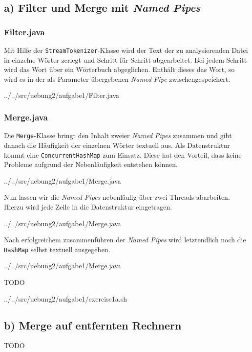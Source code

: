 \subsection*{a) Filter und Merge mit \emph{Named Pipes}}
\subsubsection*{Filter.java}
	Mit Hilfe der \texttt{StreamTokenizer}-Klasse wird der Text der zu analysierenden Datei in einzelne Wörter zerlegt und Schritt für Schritt abgearbeitet.
	Bei jedem Schritt wird das Wort über ein Wörterbuch abgeglichen. Enthält dieses das Wort, so wird es in der als Parameter übergebenen \emph{Named Pipe} zwischengespeichert.
	
	{../../src/uebung2/aufgabe1/Filter.java}

\subsubsection*{Merge.java}
	Die \texttt{Merge}-Klasse bringt den Inhalt zweier \emph{Named Pipes} zusammen und gibt danach die Häufigkeit der einzelnen Wörter textuell aus.
	Als Datenstruktur kommt eine \texttt{ConcurrentHashMap} zum Einsatz. Diese hat den Vorteil, dass keine Probleme aufgrund der Nebenläufigkeit entstehen können.
	
	{../../src/uebung2/aufgabe1/Merge.java}

	Nun lassen wir die \emph{Named Pipes} nebenläufig über zwei Threads abarbeiten. Hierzu wird jede Zeile in die Datenstruktur eingetragen.
	
	{../../src/uebung2/aufgabe1/Merge.java}

	Nach erfolgreichem zusammenführen der \emph{Named Pipes} wird letztendlich noch die \texttt{HashMap} selbst textuell ausgegeben.
	
	{../../src/uebung2/aufgabe1/Merge.java}

{\sf TODO}


 	{../../src/uebung2/aufgabe1/exercise1a.sh}


\subsection*{b) Merge auf entfernten Rechnern}

{\sf TODO}

